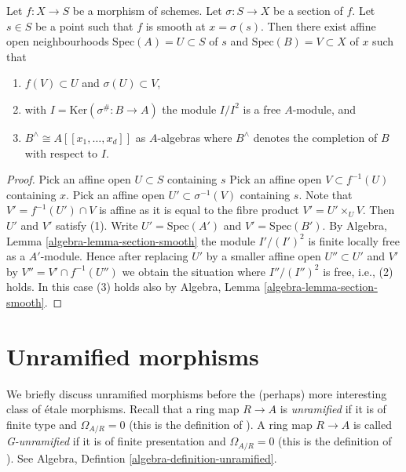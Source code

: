 \begin{lemma}
\label{lemma-section-smooth-morphism}
Let $f : X \to S$ be a morphism of schemes.
Let $\sigma : S \to X$ be a section of $f$.
Let $s \in S$ be a point such that $f$ is smooth at $x = \sigma(s)$.
Then there exist affine open neighbourhoods
$\text{Spec}(A) = U \subset S$ of $s$ and $\text{Spec}(B) = V \subset X$
of $x$ such that
\begin{enumerate}
\item $f(V) \subset U$ and $\sigma(U) \subset V$,
\item with $I = \text{Ker}(\sigma^\# : B \to A)$ the module $I/I^2$
is a free $A$-module, and
\item $B^\wedge \cong A[[x_1, \ldots, x_d]]$ as $A$-algebras where
$B^\wedge$ denotes the completion of $B$ with respect to $I$.
\end{enumerate}
\end{lemma}

\begin{proof}
Pick an affine open $U \subset S$ containing $s$
Pick an affine open $V \subset f^{-1}(U)$ containing $x$.
Pick an affine open $U' \subset \sigma^{-1}(V)$ containing $s$.
Note that $V' = f^{-1}(U') \cap V$ is affine as it is equal to the
fibre product $V' = U' \times_U V$. Then $U'$ and $V'$ satisfy (1).
Write $U' = \text{Spec}(A')$ and $V' = \text{Spec}(B')$. By
Algebra, Lemma \ref{algebra-lemma-section-smooth}
the module $I'/(I')^2$ is finite locally free as a $A'$-module.
Hence after replacing $U'$ by a smaller affine open $U'' \subset U'$
and $V'$ by $V'' = V' \cap f^{-1}(U'')$ we obtain the situation where
$I''/(I'')^2$ is free, i.e., (2) holds. In this case (3) holds also by
Algebra, Lemma \ref{algebra-lemma-section-smooth}.
\end{proof}












\section{Unramified morphisms}
\label{section-unramified}

\noindent
We briefly discuss unramified morphisms before the (perhaps) more interesting
class of \'etale morphisms. Recall that a ring map $R \to A$ is {\it unramified}
if it is of finite type and $\Omega_{A/R} = 0$ (this is the definition
of \cite{Henselian}). A ring map $R \to A$ is called {\it G-unramified} if it
is of finite presentation and $\Omega_{A/R} = 0$ (this is the definition of
\cite{EGA}). See
Algebra, Defintion \ref{algebra-definition-unramified}.

